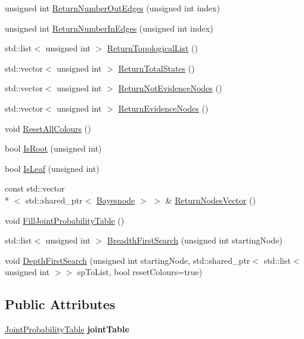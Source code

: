 \begin{DoxyCompactItemize}
\item 
unsigned int \hyperlink{classbayonet_1_1_bayesnet_aae9de07f181dc75f309b7f59e302a947}{Return\-Number\-Out\-Edges} (unsigned int index)
\item 
unsigned int \hyperlink{classbayonet_1_1_bayesnet_a7d47ce38f3882b80121f6acc351fd373}{Return\-Number\-In\-Edges} (unsigned int index)
\item 
std\-::list$<$ unsigned int $>$ \hyperlink{classbayonet_1_1_bayesnet_a3e8e924c33186e72bfa7d8ace1c211e6}{Return\-Topological\-List} ()
\item 
std\-::vector$<$ unsigned int $>$ \hyperlink{classbayonet_1_1_bayesnet_af05513604bc2273f64abd7e685d1d636}{Return\-Total\-States} ()
\item 
std\-::vector$<$ unsigned int $>$ \hyperlink{classbayonet_1_1_bayesnet_ac9f389cd6382946deb5b04cb6513f11e}{Return\-Not\-Evidence\-Nodes} ()
\item 
std\-::vector$<$ unsigned int $>$ \hyperlink{classbayonet_1_1_bayesnet_a8610f2ec52297edfe6bf2151d2ce002c}{Return\-Evidence\-Nodes} ()
\item 
void \hyperlink{classbayonet_1_1_bayesnet_a2a934ac59da3a02720c40515b6b599e7}{Reset\-All\-Colours} ()
\item 
bool \hyperlink{classbayonet_1_1_bayesnet_a5877478cf225ed47f43df29cc087c5d6}{Is\-Root} (unsigned int)
\item 
bool \hyperlink{classbayonet_1_1_bayesnet_af9809dc12e3f77859f9674ced08fe7b0}{Is\-Leaf} (unsigned int)
\item 
const std\-::vector\\*
$<$ std\-::shared\-\_\-ptr$<$ \hyperlink{classbayonet_1_1_bayesnode}{Bayesnode} $>$ $>$ \& \hyperlink{classbayonet_1_1_bayesnet_ab0e31b9a2b625b5b59d3e70e3c7e4101}{Return\-Nodes\-Vector} ()
\item 
void \hyperlink{classbayonet_1_1_bayesnet_a586e4951a91ac2c47d8448caea25d657}{Fill\-Joint\-Probability\-Table} ()
\item 
std\-::list$<$ unsigned int $>$ \hyperlink{classbayonet_1_1_bayesnet_adef5210316c514cd50e977d5bc6292e5}{Breadth\-First\-Search} (unsigned int starting\-Node)
\item 
void \hyperlink{classbayonet_1_1_bayesnet_a8ab753ba22b35727cce998e2266b9afe}{Depth\-First\-Search} (unsigned int starting\-Node, std\-::shared\-\_\-ptr$<$ std\-::list$<$ unsigned int $>$$>$ sp\-To\-List, bool reset\-Colours=true)
\end{DoxyCompactItemize}
\subsection*{Public Attributes}
\begin{DoxyCompactItemize}
\item 
\hypertarget{classbayonet_1_1_bayesnet_ae162418e729b5c401f36ed1ef1d1b980}{\hyperlink{classbayonet_1_1_joint_probability_table}{Joint\-Probability\-Table} {\bfseries joint\-Table}}\label{classbayonet_1_1_bayesnet_ae162418e729b5c401f36ed1ef1d1b980}

\end{DoxyCompactItemize}



